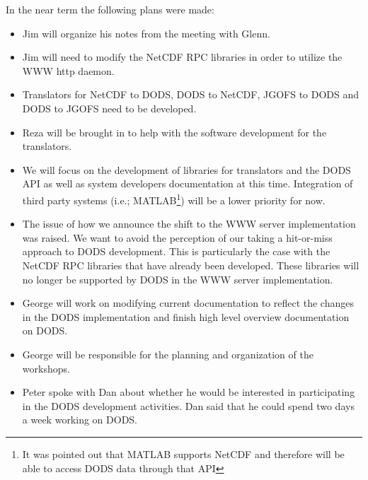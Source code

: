 In the near term the following plans were made:

\begin{itemize} 
  \item Jim will organize his notes from the meeting with Glenn.
  \item Jim will need to modify the NetCDF RPC libraries in order to
        utilize the WWW http daemon.
  \item Translators for NetCDF to DODS, DODS to NetCDF, JGOFS to DODS and
        DODS to JGOFS need to be developed.
  \item Reza will be brought in to help with the software development for the
        translators.
  \item We will focus on the development of libraries for translators and the
        DODS API as well as system developers documentation at this time.
        Integration of third party systems (i.e.; MATLAB\footnote{It was
        pointed out that MATLAB supports NetCDF and therefore will be able to
        access DODS data through that API}) will be a lower priority for now. 
  \item The issue of how we announce the shift to the WWW server
        implementation was raised.  We want to avoid the perception of our
        taking a hit-or-miss approach to DODS development.  This is
	particularly the case with the NetCDF RPC libraries that have already
        been developed.  These libraries will no longer be supported by DODS
        in the WWW server implementation.  
  \item George will work on modifying current documentation to reflect the
        changes in the DODS implementation and finish high level overview
        documentation on DODS.
  \item George will be responsible for the planning and organization of the
        workshops.
  \item Peter spoke with Dan about whether he would be interested in
        participating in the DODS development activities.  Dan said that he
        could spend two days a week working on DODS.
\end{itemize}


 
